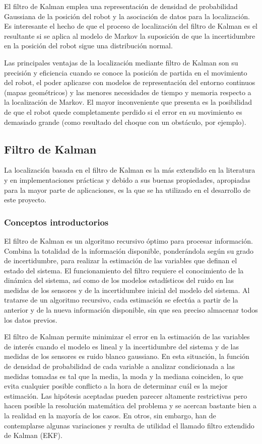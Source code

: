 El filtro de Kalman emplea una representación de densidad de probabilidad Gaussiana de la posición del robot y la asociación de datos para la localización. Es interesante el hecho de que el proceso de localización del filtro de Kalman es el resultante si se aplica al modelo de Markov la suposición de que la incertidumbre en la posición del robot sigue una distribución normal.

Las principales ventajas de la localización mediante filtro de Kalman son su precisión y eficiencia cuando se conoce la posición de partida en el movimiento del robot, el poder aplicarse con modelos de representación del entorno continuos (mapas geométricos) y las menores necesidades de tiempo y memoria respecto a la localización de Markov. El mayor inconveniente que presenta es la posibilidad de que el robot quede completamente perdido si el error en su movimiento es demasiado grande (como resultado del choque con un obstáculo, por ejemplo).

\subsection {Filtro de Kalman}
La localización basada en el filtro de Kalman es la más extendido en la literatura y en implementaciones prácticas y debido a sus buenas propiedades, apropiadas para la mayor parte de aplicaciones, es la que se ha utilizado en el desarrollo de este proyecto.

\subsubsection {Conceptos introductorios}
El filtro de Kalman es un algoritmo recursivo óptimo para procesar información\cite{Maybeck79}. Combina la totalidad de la información disponible, ponderándola según su grado de incertidumbre, para realizar la estimación de las variables que definan el estado del sistema. El funcionamiento del filtro requiere el conocimiento de la dinámica del sistema, así como de los modelos estadísticos del ruido en las medidas de los sensores y de la incertidumbre inicial del modelo del sistema. Al tratarse de un algoritmo recursivo, cada estimación se efectúa a partir de la anterior y de la nueva información disponible, sin que sea preciso almacenar todos los datos previos.

El filtro de Kalman permite minimizar el error en la estimación de las variables de interés cuando el modelo es lineal y la incertidumbre del sistema y de las medidas de los sensores es ruido blanco gaussiano. En esta situación, la función de densidad de probabilidad de cada variable a analizar condicionada a las medidas tomadas es tal que la media, la moda y la mediana coinciden, lo que evita cualquier posible conflicto a la hora de determinar cuál es la mejor estimación.
Las hipótesis aceptadas pueden parecer altamente restrictivas pero hacen posible la resolución matemática del problema y se acercan bastante bien a la realidad en la mayoría de los casos. En otros, sin embargo, han de contemplarse algunas variaciones y resulta de utilidad el llamado filtro extendido de Kalman (EKF).

